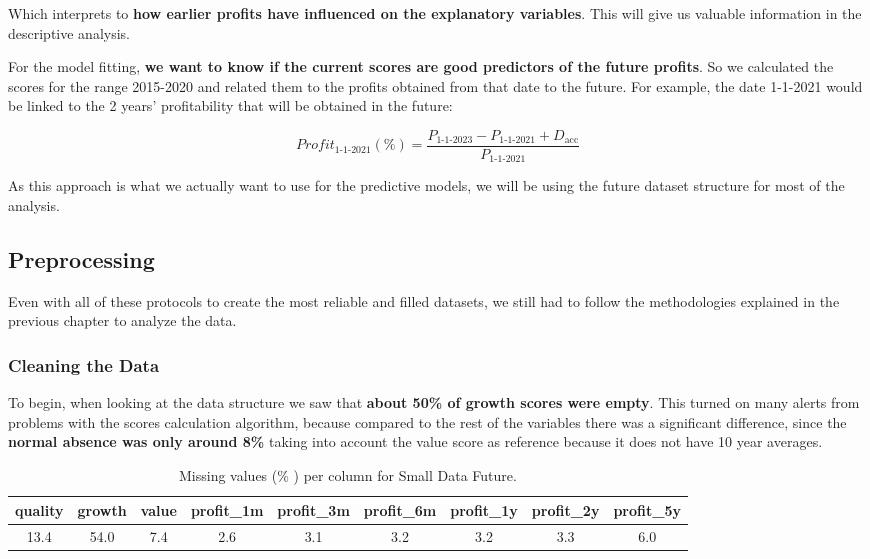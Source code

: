 \documentclass[11pt,english,a4paper,hidelinks]{book}
\begin{document}
\noindent Which interprets to \textbf{how earlier profits have influenced on the explanatory variables}. This will give us valuable information in the descriptive analysis.

\vspace{0.5cm}
\noindent For the model fitting, \textbf{we want to know if the current scores are good predictors of the future profits}. So we calculated the scores for the range 2015-2020 and related them to the profits obtained from that date to the future. For example, the date 1-1-2021 would be linked to the 2 years' profitability that will be obtained in the future: 

\begin{equation}
    Profit_{1\text{-}1\text{-}2021}(\%) = \frac{P_{1\text{-}1\text{-}2023} - P_{1\text{-}1\text{-}2021} + D_{\text{acc}}}{P_{1\text{-}1\text{-}2021}}
\end{equation}

\noindent As this approach is what we actually want to use for the predictive models, we will be using the future dataset structure for most of the analysis.

\subsection{Preprocessing}
Even with all of these protocols to create the most reliable and filled datasets, we still had to follow the methodologies explained in the previous chapter to analyze the data.

\subsubsection{Cleaning the Data}
To begin, when looking at the data structure we saw that \textbf{about 50\% of growth scores were empty}. This turned on many alerts from problems with the scores calculation algorithm, because compared to the rest of the variables there was a significant difference, since the \textbf{normal absence was only around 8\%} taking into account the value score as reference because it does not have 10 year averages.
\begin{table}[H]
    \centering
    \begin{tabular}{|c|c|c|c|c|c|c|c|c|}
        \hline
        \textbf{quality} & \textbf{growth} & \textbf{value} & \textbf{profit\_1m} & \textbf{profit\_3m} & \textbf{profit\_6m} & \textbf{profit\_1y} & \textbf{profit\_2y} & \textbf{profit\_5y} \\
        \hline
        13.4 & 54.0 & 7.4 & 2.6 & 3.1 & 3.2 & 3.2 & 3.3 & 6.0 \\
        \hline
    \end{tabular}
    \caption{Missing values (\% ) per column for Small Data Future.}
    \label{tab:missing_values_small_data_future}
\end{table}
\end{document}

